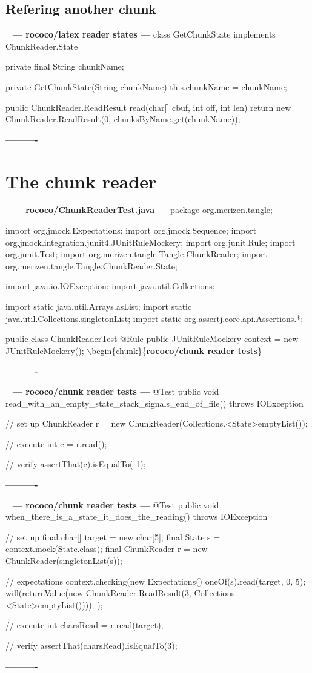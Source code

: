 \documentclass{book}
\newenvironment{chunk}[1]{%
{\ }\newline\noindent%
\hbox{\hskip 2.0cm}{\bf --- #1 ---}%
\verbatim}%                               say exactly what we see
{\endverbatim%
\par{}%
\noindent{}%
\hbox{\hskip 2.0cm}{\bf ----------}%
\par%
\normalsize\noindent}%
\providecommand{\getchunk}[1]{%
\noindent%
{\small $\backslash{}$begin\{chunk\}\{{\bf #1}\}}%
\index{{#1}}}
\begin{document}
\subsection{Refering another chunk}
\begin{chunk}{rococo/latex reader states}
class GetChunkState implements ChunkReader.State {
    private final String chunkName;

    private GetChunkState(String chunkName) {
        this.chunkName = chunkName;
    }

    public ChunkReader.ReadResult read(char[] cbuf, int off, int len) {
        return new ChunkReader.ReadResult(0, chunksByName.get(chunkName));
    }
}
\end{chunk}

\section{The chunk reader}
\begin{chunk}{rococo/ChunkReaderTest.java}
package org.merizen.tangle;

import org.jmock.Expectations;
import org.jmock.Sequence;
import org.jmock.integration.junit4.JUnitRuleMockery;
import org.junit.Rule;
import org.junit.Test;
import org.merizen.tangle.Tangle.ChunkReader;
import org.merizen.tangle.Tangle.ChunkReader.State;

import java.io.IOException;
import java.util.Collections;

import static java.util.Arrays.asList;
import static java.util.Collections.singletonList;
import static org.assertj.core.api.Assertions.*;

public class ChunkReaderTest {
    @Rule
    public JUnitRuleMockery context = new JUnitRuleMockery();
\getchunk{rococo/chunk reader tests}
}
\end{chunk}

\begin{chunk}{rococo/chunk reader tests}
@Test
public void read_with_an_empty_state_stack_signals_end_of_file() throws IOException {
    // set up
    ChunkReader r = new ChunkReader(Collections.<State>emptyList());

    // execute
    int c = r.read();

    // verify
    assertThat(c).isEqualTo(-1);
}
\end{chunk}

\begin{chunk}{rococo/chunk reader tests}
@Test
public void when_there_is_a_state_it_does_the_reading() throws IOException {
    // set up
    final char[] target = new char[5];
    final State s = context.mock(State.class);
    final ChunkReader r = new ChunkReader(singletonList(s));

    // expectations
    context.checking(new Expectations() {{
        oneOf(s).read(target, 0, 5);
        will(returnValue(new ChunkReader.ReadResult(3, Collections.<State>emptyList())));
    }});

    // execute
    int charsRead = r.read(target);

    // verify
    assertThat(charsRead).isEqualTo(3);
}
\end{chunk}
\end{document}
